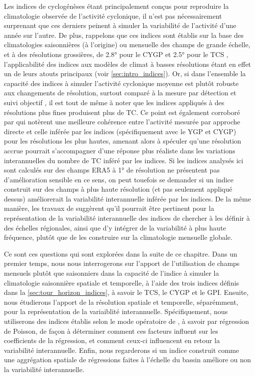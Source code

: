 \documentclass[../main.tex]{subfiles}
\begin{document}
Les indices de cyclogénèses étant principalement conçus pour reproduire la climatologie observée de l'activité cyclonique, il n'est pas nécessairement
surprenant que ces derniers peinent à simuler la variabilité de l'activité d'une année sur l'autre. De plus, rappelons que ces indices sont établis sur la base
des climatologies saisonnières (à l'origine) ou mensuelle des champs de grande échelle, et à des résolutions grossières, de \ang{2.8} pour le CYGP
\parencite{royer_gcm_1998} et \ang{2.5} pour le TCS \parencite{tippett_poisson_2011}, l'applicabilité des indices aux modèles de climat à basses résolutions
étant en effet un de leurs atouts principaux (voir \cref{sec:intro_indices}). Or, si dans l'ensemble la capacité des indices à simuler l'activité cyclonique
moyenne est plutôt robuste aux changements de résolution, surtout comparé à la mesure par détection et suivi objectif \parencite[][voir aussi
\cref{fig:GP_resolution}]{camargo_tropical_2007}, il est tout de même à noter que les indices appliqués à des résolutions plus fines produisent plus de TC. Ce
point est également corroboré par \textcite{mcdonald_tropical_2005} qui notèrent une meilleure cohérence entre l'activité mesurée par approche directe et celle
inférée par les indices (spécifiquement avec le YGP et CYGP) pour les résolutions les plus hautes, amenant alors \textcite{camargo_tropical_2007} à spéculer
qu'une résolution accrue pourrait s'accompagner d'une réponse plus réaliste dans les variations interannuelles du nombre de TC inféré par les indices. Si les
indices analysés ici sont calculés sur des champs ERA5 à \ang{1} de résolution ne présentent pas d'amélioration sensible en ce sens, on peut touefois se
demander si un indice construit sur des champs à plus haute résolution (et pas seulement appliqué dessus) améliorerait la variabilité interannuelle inférée par
les indices. De la même manière, les travaux de \textcite{bruyere_investigating_2012,waters_largescale_2012} suggèrent qu'il pourrait être pertinent pour la
représentation de la variabilité interannuelle des indices de chercher à les définir à des échelles régionales, ainsi que d'y intégrer de la variabilité à plus
haute fréquence, plutôt que de les construire sur la climatologie mensuelle globale.

Ce sont ces questions qui sont explorées dans la suite de ce chapitre. Dans un premier temps, nous nous interrogerons sur l'apport de l'utilisation de champs
mensuels plutôt que saisonniers dans la capacité de l'indice à simuler la climatologie saisonnière spatiale et temporelle, à l'aide des trois indices définis
dans la \cref{sec:tour_horizon_indices}, à savoir le TCS, le CYGP et le GPI. Ensuite, nous étudierons l'apport de la résolution spatiale et temporelle,
séparémment, pour la représentation de la variaiblité interannuelle. Spécifiquement, nous utiliserons des indices établis selon le mode opératoire de
\textcite{tippett_poisson_2011}, à savoir par régression de Poisson, de façon à déterminer comment ces facteurs influent sur les coefficients de la régression,
et comment ceux-ci influencent en retour la variabilité interannuelle. Enfin, nous regarderons si un indice construit comme une aggrégation spatiale de
régressions faites à l'échelle du bassin améliore ou non la variabilité interannuelle.
\end{document}
